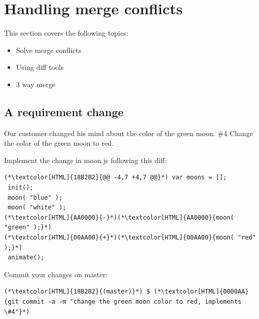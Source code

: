 \section{Handling merge conflicts}
\begin{frame}[fragile]
  \slidetitle
  This section covers the following topics:
  \begin{itemize}
    \pause
    \item Solve merge conflicts
    \pause
    \item Using diff tools
    \pause
    \item 3 way merge
  \end{itemize}
\end{frame}

\subsection{A requirement change}
\begin{frame}[fragile]
  \subslidetitle
  Our customer changed his mind about the color of the green moon.
  \newline \vspace{1em}
  \#4 Change the color of the green moon to red.

  Implement the change in moon.js following this diff:
  \begin{lstlisting}
(*\textcolor[HTML]{18B2B2}{@@ -4,7 +4,7 @@}*) var moons = [];
 init();
 moon( "blue" );
 moon( "white" );
(*\textcolor[HTML]{AA0000}{-}*)(*\textcolor[HTML]{AA0000}{moon( "green" );}*)
(*\textcolor[HTML]{00AA00}{+}*)(*\textcolor[HTML]{00AA00}{moon( "red" );}*)
 animate();
\end{lstlisting}

  Commit your changes on master:
  \begin{lstlisting}
(*\textcolor[HTML]{18B2B2}{(master)}*) $ (*\textcolor[HTML]{0000AA}{git commit -a -m "change the green moon color to red, implements \#4"}*)
\end{lstlisting}

\end{frame}

